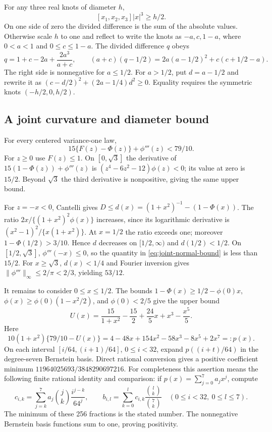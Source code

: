For any three real knots of diameter $h$,
\begin{equation}\label{eq:contact-dd-diameter}
 [x_1,x_2,x_3]|x|^3\ge h/2.
\end{equation}
On one side of zero the divided difference is the sum of the absolute
values. Otherwise scale $h$ to one and reflect to write the knots as
$-a,c,1-a$, where $0<a<1$ and $0\le c\le1-a$. The divided difference
$q$ obeys
\[
 q=1+c-2a+\frac{2a^3}{a+c},\qquad
 (a+c)(q-1/2)=2a(a-1/2)^2+c(c+1/2-a).
\]
The right side is nonnegative for $a\le1/2$. For $a>1/2$, put
$d=a-1/2$ and rewrite it as $(c-d/2)^2+(2a-1/4)d^2\ge0$.
Equality requires the symmetric knots $(-h/2,0,h/2)$.
\subsection{A joint curvature and diameter bound}\label{contact:joint-curvature-diameter}
For every centered variance-one law,
\begin{equation}\label{eq:joint-normal-bound}
 15\{F(z)-\Phi(z)\}+\phi'''(z)<79/10.
\end{equation}
For $z\ge0$ use $F(z)\le1$. On $[0,\sqrt3]$ the derivative of
$15(1-\Phi(z))+\phi'''(z)$ is
$(z^4-6z^2-12)\phi(z)<0$; its value at zero is $15/2$. Beyond $\sqrt3$
the third derivative is nonpositive, giving the same upper bound.

For $z=-x<0$, Cantelli gives
$D\le d(x)=(1+x^2)^{-1}-(1-\Phi(x))$.
The ratio $2x/\{(1+x^2)^2\phi(x)\}$ increases, since its logarithmic
derivative is $(x^2-1)^2/\{x(1+x^2)\}$. At $x=1/2$ the ratio exceeds
one; moreover $1-\Phi(1/2)>3/10$. Hence $d$ decreases on $[1/2,\infty)$
and $d(1/2)<1/2$. On $[1/2,\sqrt3]$, $\phi'''(-x)\le0$, so the
quantity in \eqref{eq:joint-normal-bound} is less than $15/2$.
For $x\ge\sqrt3$, $d(x)<1/4$ and Fourier inversion gives
$\|\phi'''\|_\infty\le2/\pi<2/3$, yielding $53/12$.

It remains to consider $0\le x\le1/2$. The bounds
$1-\Phi(x)\ge1/2-\phi(0)x$,
$\phi(x)\ge\phi(0)(1-x^2/2)$, and $\phi(0)<2/5$ give the upper bound
\[
 U(x)=\frac{15}{1+x^2}-\frac{15}2+\frac{24}5x+x^3-\frac{x^5}5.
\]
Here
\[
 10(1+x^2)\{79/10-U(x)\}
 =4-48x+154x^2-58x^3-8x^5+2x^7=:p(x).
\]
On each interval $[i/64,(i+1)/64]$, $0\le i<32$, expand
$p((i+t)/64)$ in the degree-seven Bernstein basis. Direct rational
conversion gives a positive coefficient minimum
$11964025693/3848290697216$. For completeness this assertion means the
following finite rational identity and comparison: if
$p(x)=\sum_{j=0}^7a_jx^j$, compute
\[
 c_{i,k}=\sum_{j=k}^7 a_j\binom jk\frac{i^{j-k}}{64^j},\qquad
 b_{i,l}=\sum_{k=0}^l c_{i,k}\frac{\binom lk}{\binom7k}
 \quad(0\le i<32,\ 0\le l\le7).
\]
The minimum of these 256 fractions is the stated number.
The nonnegative Bernstein basis functions sum to one, proving positivity.

